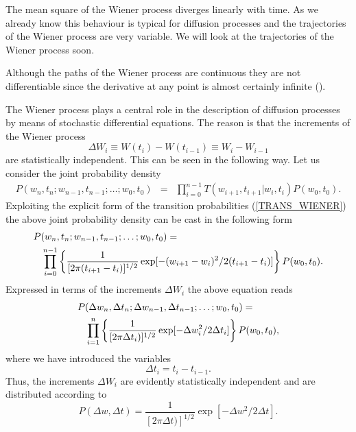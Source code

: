 The mean square of the Wiener process diverges linearly with time.
As we already know this behaviour is typical for diffusion 
processes and the trajectories of the Wiener process are very 
variable. We will look at the trajectories of the Wiener process 
soon. 

Although the paths of the Wiener process are continuous they are 
not differentiable since the derivative at any point is 
almost certainly infinite (\cite{GARDINER}).

The Wiener process plays a central role in the description of 
diffusion processes by means of stochastic differential equations.
The reason is that the increments of the Wiener process
\begin{equation*}
\Delta W_i \equiv W(t_i) - W(t_{i-1}) \equiv W_i -W_{i-1} 
\end{equation*}
are statistically independent. This can be seen in the following 
way. Let us consider the joint probability density
\begin{eqnarray*}
P(w_n,t_n; w_{n-1},t_{n-1}; \ldots ; w_0,t_0) &=&
\prod_{i=0}^{n-1} T(w_{i+1},t_{i+1}|w_i,t_i) P(w_0,t_0).
\end{eqnarray*}
Exploiting the explicit form of the transition probabilities
(\ref{TRANS_WIENER}) the above joint probability density can be 
cast in the following form
\begin{eqnarray*}
\lefteqn{P(w_n,t_n; w_{n-1},t_{n-1}; \ldots ; w_0,t_0) =} \\
& & \prod_{i=0}^{n-1} 
\left\{ \frac{1}{[2 \pi (t_{i+1}-t_i)]^{1/2}}
\exp[-(w_{i+1}-w_i)^2/2(t_{i+1}-t_i)]
\right\}
P(w_0,t_0).
\end{eqnarray*}
Expressed in terms of the increments $\Delta W_i$ the above 
equation reads
\begin{eqnarray*}
\lefteqn{
P(\Delta w_n,\Delta t_n; \Delta w_{n-1},\Delta t_{n-1}; \ldots ; w_0,t_0) =} \\
& &\prod_{i=1}^{n} 
\left\{ \frac{1}{[2 \pi \Delta t_i)]^{1/2}}
\exp[-\Delta w_i^2/2 \Delta t_i]
\right\}
P(w_0,t_0),
\end{eqnarray*}
where we have introduced the variables
\begin{equation*}
\Delta t_i = t_{i} - t_{i-1}.
\end{equation*}
Thus, the increments $\Delta W_i$ are evidently statistically
independent and are distributed according to
\begin{equation*}
P(\Delta w,\Delta t) = \frac{1}{[2 \pi \Delta t)]^{1/2}}
\exp[-\Delta w^2/2 \Delta t].
\end{equation*}

